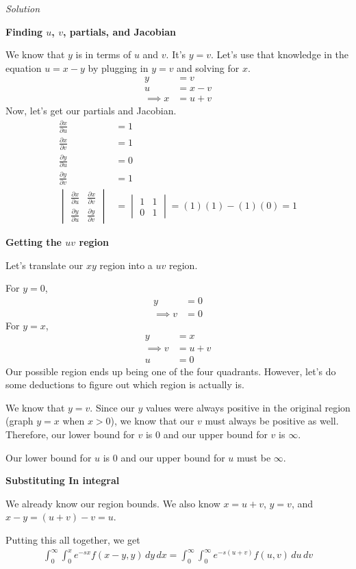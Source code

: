 \documentclass{article}
\newcommand{\Solution}{\textit{Solution}}
\begin{document}
\Solution

{}\textbf{Finding $u$, $v$, partials, and Jacobian}


We know that $y$ is in terms of $u$ and $v$. It's $y=v$. Let's use that knowledge in the equation $u=x-y$ by plugging in $y=v$ and solving for $x$.
\begin{align*}
   y&=v\\
   u&=x-v\\
   \implies x &= u+v
\end{align*}
Now, let's get our partials and Jacobian.
\begin{align*}
    \frac{\partial x}{\partial u}&= 1\\
   \frac{\partial x}{\partial v}&=1\\
   \frac{\partial y}{\partial u}&=0\\
   \frac{\partial y}{\partial v}&=1\\
    \begin{vmatrix}
    \frac{\partial x}{\partial u} & \frac{\partial x}{\partial v}\\
    \frac{\partial y}{\partial u} & 
    \frac{\partial y}{\partial v}
    \end{vmatrix}&=\begin{vmatrix}
      1 & 1\\
      0 & 1
    \end{vmatrix}=(1)(1)-(1)(0)=1
\end{align*}
{}\textbf{Getting the $uv$ region}

Let's translate our $xy$ region into a $uv$ region.

For $y=0$,
\begin{align*}
    y&=0\\
   \implies v&=0
\end{align*}
For $y=x$,
\begin{align*}
   y&=x\\
  \implies v&=u+v\\
   u&=0
\end{align*}
Our possible region ends up being one of the four quadrants. However, let's do some deductions to figure out which region is actually is.

We know that $y=v$. Since our $y$ values were always positive in the original region (graph $y=x$ when $x>0$), we know that our $v$ must always be positive as well. Therefore, our lower bound for $v$ is $0$ and our upper bound for $v$ is $\infty$.

Our lower bound for $u$ is $0$ and our upper bound for $u$ must be $\infty$.

{}\textbf{Substituting In integral}

We already know our region bounds. We also know $x=u+v$, $y=v$, and $x-y=(u+v)-v=u$.

Putting this all together, we get
\begin{align*}
    \int_0^\infty\int_0^xe^{-sx}f(x-y,y)\,dy\,dx=\int_0^\infty\int_0^\infty e^{-s(u+v)}f(u,v)\,du\,dv
\end{align*}
\end{document}
